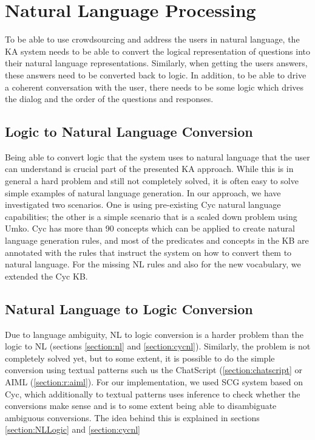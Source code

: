 \section{Natural Language Processing}
\label{section:bg:nlp}
To be able to use crowdsourcing and address the users in natural language, the 
KA system needs to be able to convert the logical representation of questions 
into their natural language representations. Similarly, when getting the users 
answers, these answers need to be converted back to logic. In addition, to be 
able to drive a coherent conversation with the user, there needs to be some 
logic which drives the dialog and the order of the questions and responses.

\subsection{Logic to Natural Language Conversion}
Being able to convert logic that the system uses to natural language that the 
user can understand is crucial part of the presented KA approach. While this is 
in general a hard problem and still not completely solved, it is often easy to 
solve simple examples of natural language generation. In our approach, we have 
investigated two scenarios. One is using pre-existing Cyc natural language 
capabilities; the other is a simple scenario that is a scaled down problem 
using Umko. Cyc has more than 90 concepts which can be applied to create 
natural language generation rules\parencite{Baxter2005}, and most of the 
predicates and concepts in the KB are annotated with the rules that instruct 
the system on how to convert them to natural language. For the missing NL 
rules and also for the new vocabulary, we extended the Cyc KB.

\subsection{Natural Language to Logic Conversion}
\label{section:bg:nlToLogic}
Due to language ambiguity, 
NL to logic conversion is a harder problem than the logic to NL
\parencite{Schneider2015} (sections \ref{section:nl} and \ref{section:cycnl}). 
Similarly, the problem is not completely solved yet, but to some extent, it is 
possible to do the simple conversion using textual patterns such us the 
ChatScript (\autoref{section:chatscript} or AIML (\autoref{section:r:aiml}). 
For our implementation, we used SCG system based on Cyc, which additionally to 
textual patterns uses 
inference to check whether the conversions make sense and is to some extent 
being able to disambiguate ambiguous conversions\parencite{Schneider2015}.
The idea behind this is explained in sections \ref{section:NLLogic} and
\ref{section:cycnl}

